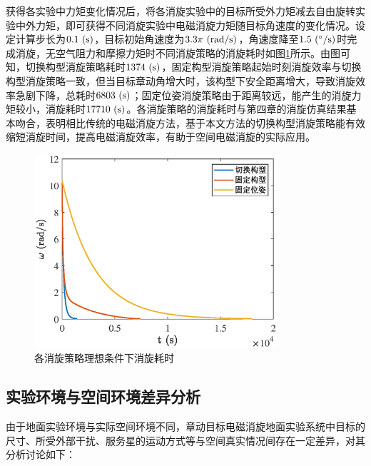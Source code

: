 \documentclass[lang=chs, degree=master, blindreview=false, winfonts=true]{yanputhesis}
\begin{document}
获得各实验中力矩变化情况后，将各消旋实验中的目标所受外力矩减去自由旋转实验中外力矩，即可获得不同消旋实验中电磁消旋力矩随目标角速度的变化情况。设定计算步长为$0.1\ \rm{(s)}$，目标初始角速度为$3.3\pi\ \rm{(rad/s)}$，角速度降至$1.5\ \rm{(^\circ/s)}$时完成消旋，无空气阻力和摩擦力矩时不同消旋策略的消旋耗时如图\ref{fig:exp_simu_detum_time}所示。由图可知，切换构型消旋策略耗时$1374\ \rm{(s)}$，固定构型消旋策略起始时刻消旋效率与切换构型消旋策略一致，但当目标章动角增大时，该构型下安全距离增大，导致消旋效率急剧下降，总耗时$6803\ \rm{(s)}$；固定位姿消旋策略由于距离较远，能产生的消旋力矩较小，消旋耗时$17710\ \rm{(s)}$。各消旋策略的消旋耗时与第四章的消旋仿真结果基本吻合，表明相比传统的电磁消旋方法，基于本文方法的切换构型消旋策略能有效缩短消旋时间，提高电磁消旋效率，有助于空间电磁消旋的实际应用。
\begin{figure}[htb!]
	\centering
	\includegraphics[width = 3.55in]{picture/exp_simu_detum_time.eps}
	\caption{各消旋策略理想条件下消旋耗时}
	\label{fig:exp_simu_detum_time}
\end{figure}

\subsection{实验环境与空间环境差异分析}
由于地面实验环境与实际空间环境不同，章动目标电磁消旋地面实验系统中目标的尺寸、所受外部干扰、服务星的运动方式等与空间真实情况间存在一定差异，对其分析讨论如下：
\end{document}
